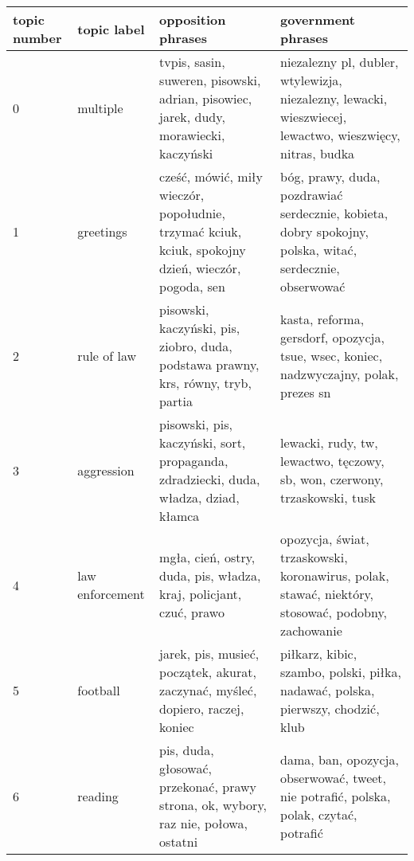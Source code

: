 \begin{tabular}{p{2cm}p{2cm}p{5cm}p{5cm}}
\toprule
topic number &              topic label &                                                                                               opposition phrases &                                                                                                      government phrases \\
\midrule
           0 &                 multiple &                            tvpis, sasin, suweren, pisowski, adrian, pisowiec, jarek, dudy, morawiecki, kaczyński &                niezalezny pl, dubler, wtylewizja, niezalezny, lewacki, wieszwiecej, lewactwo, wieszwięcy, nitras, budka \\
           1 &                greetings &               cześć, mówić, miły wieczór, popołudnie, trzymać kciuk, kciuk, spokojny dzień, wieczór, pogoda, sen &                 bóg, prawy, duda, pozdrawiać serdecznie, kobieta, dobry spokojny, polska, witać, serdecznie, obserwować \\
           2 &              rule of law &                                pisowski, kaczyński, pis, ziobro, duda, podstawa prawny, krs, równy, tryb, partia &                                  kasta, reforma, gersdorf, opozycja, tsue, wsec, koniec, nadzwyczajny, polak, prezes sn \\
           3 &               aggression &                             pisowski, pis, kaczyński, sort, propaganda, zdradziecki, duda, władza, dziad, kłamca &                                              lewacki, rudy, tw, lewactwo, tęczowy, sb, won, czerwony, trzaskowski, tusk \\
           4 &          law enforcement &                                               mgła, cień, ostry, duda, pis, władza, kraj, policjant, czuć, prawo &                       opozycja, świat, trzaskowski, koronawirus, polak, stawać, niektóry, stosować, podobny, zachowanie \\
           5 &                 football &                                  jarek, pis, musieć, początek, akurat, zaczynać, myśleć, dopiero, raczej, koniec &                                         piłkarz, kibic, szambo, polski, piłka, nadawać, polska, pierwszy, chodzić, klub \\
           6 &                  reading &                               pis, duda, głosować, przekonać, prawy strona, ok, wybory, raz nie, połowa, ostatni &                                   dama, ban, opozycja, obserwować, tweet, nie potrafić, polska, polak, czytać, potrafić \\

\end{tabular}
